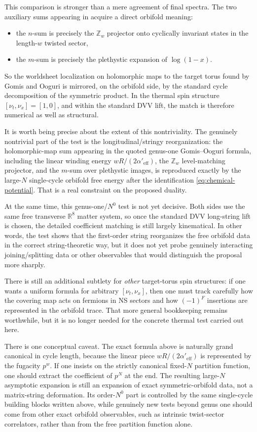 \documentclass[11pt]{article}
\newcommand{\Aeff}{\alpha'_{\mathrm{eff}}}
\newcommand{\bR}{\mathbb{R}}
\begin{document}
This comparison is stronger than a mere agreement of final spectra. The two auxiliary sums appearing in \cite{gomis2000nonrelativisticclosedstringtheory} acquire a direct orbifold meaning:
\begin{itemize}
\item the $n$-sum is precisely the $\mathbb Z_w$ projector onto cyclically invariant states in the length-$w$ twisted sector,
\item the $m$-sum is precisely the plethystic expansion of $\log(1-x)$.
\end{itemize}
So the worldsheet localization on holomorphic maps to the target torus found by Gomis and Ooguri is mirrored, on the orbifold side, by the standard cycle decomposition of the symmetric product. In the thermal spin structure $[\nu_t,\nu_x]=[1,0]$, and within the standard DVV lift, the match is therefore numerical as well as structural.

It is worth being precise about the extent of this nontriviality. The genuinely nontrivial part of the test is the longitudinal/stringy reorganization: the holomorphic-map sum appearing in the quoted genus-one Gomis--Ooguri formula, including the linear winding energy $wR/(2\Aeff)$, the $\mathbb Z_w$ level-matching projector, and the $m$-sum over plethystic images, is reproduced exactly by the large-$N$ single-cycle orbifold free energy after the identification \eqref{eq:chemical-potential}. That is a real constraint on the proposed duality.

At the same time, this genus-one/$N^0$ test is not yet decisive. Both sides use the same free transverse $\bR^8$ matter system, so once the standard DVV long-string lift is chosen, the detailed coefficient matching is still largely kinematical. In other words, the test shows that the first-order string reorganizes the free orbifold data in the correct string-theoretic way, but it does not yet probe genuinely interacting joining/splitting data or other observables that would distinguish the proposal more sharply.

There is still an additional subtlety for \emph{other} target-torus spin structures: if one wants a uniform formula for arbitrary $[\nu_t,\nu_x]$, then one must track carefully how the covering map acts on fermions in NS sectors and how $(-1)^F$ insertions are represented in the orbifold trace. That more general bookkeeping remains worthwhile, but it is no longer needed for the concrete thermal test carried out here.

There is one conceptual caveat. The exact formula above is naturally grand canonical in cycle length, because the linear piece $wR/(2\Aeff)$ is represented by the fugacity $p^w$. If one insists on the strictly canonical fixed-$N$ partition function, one should extract the coefficient of $p^N$ at the end. The resulting large-$N$ asymptotic expansion is still an expansion of exact symmetric-orbifold data, not a matrix-string deformation. Its order-$N^0$ part is controlled by the same single-cycle building blocks written above, while genuinely new tests beyond genus one should come from other exact orbifold observables, such as intrinsic twist-sector correlators, rather than from the free partition function alone.
\end{document}
